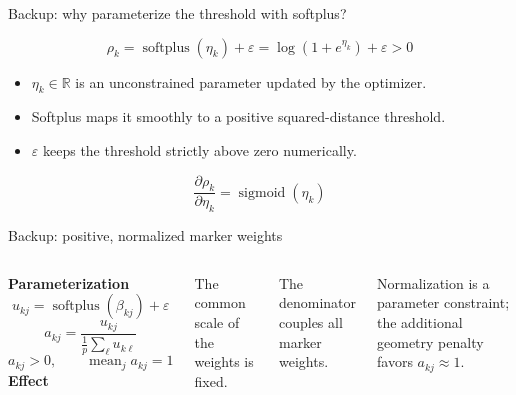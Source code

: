 \documentclass[aspectratio=169,10pt]{beamer}
\newcommand{\sig}{\operatorname{sigmoid}}
\begin{document}
\begin{frame}{Backup: why parameterize the threshold with softplus?}

\[\rho_k=\operatorname{softplus}(\eta_k)+\varepsilon
=\log(1+e^{\eta_k})+\varepsilon>0\]
\begin{itemize}
\item $\eta_k\in\mathbb R$ is an unconstrained parameter updated by the optimizer.
\item Softplus maps it smoothly to a positive squared-distance threshold.
\item $\varepsilon$ keeps the threshold strictly above zero numerically.
\end{itemize}
\[\frac{\partial\rho_k}{\partial\eta_k}=\sig(\eta_k)\]

\end{frame}

\begin{frame}{Backup: positive, normalized marker weights}

\begin{columns}[T,onlytextwidth]
\textbf{Parameterization}
\[u_{kj}=\operatorname{softplus}(\beta_{kj})+\varepsilon\]
\[a_{kj}=\frac{u_{kj}}{\frac1p\sum_\ell u_{k\ell}}\]
\[a_{kj}>0,\qquad \operatorname{mean}_j a_{kj}=1\]
\textbf{Effect}\par
The common scale of the weights is fixed.\par
\vspace{3mm}
The denominator couples all marker weights.\par
\vspace{3mm}
Normalization is a parameter constraint; the additional geometry penalty favors $a_{kj}\approx1$.
\end{columns}

\end{frame}
\end{document}
